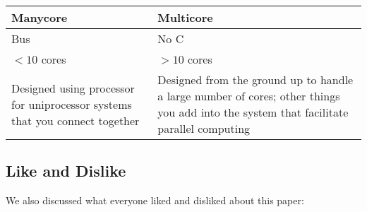 \begin{center}
    \begin{tabular}{p{7cm} p{7cm}}
        \toprule
        Manycore & Multicore \\
        \midrule
        Bus & No C \\
        \( <10 \) cores & \( >10 \) cores \\
        Designed using processor for uniprocessor systems that you connect together & Designed from the ground up to handle a large number of cores; other things you add into the system that facilitate parallel computing \\
        \bottomrule
    \end{tabular}
\end{center}

\subsection{Like and Dislike}\label{feb-11:a-view:like-dislike}
We also discussed what everyone liked and disliked about this paper:

